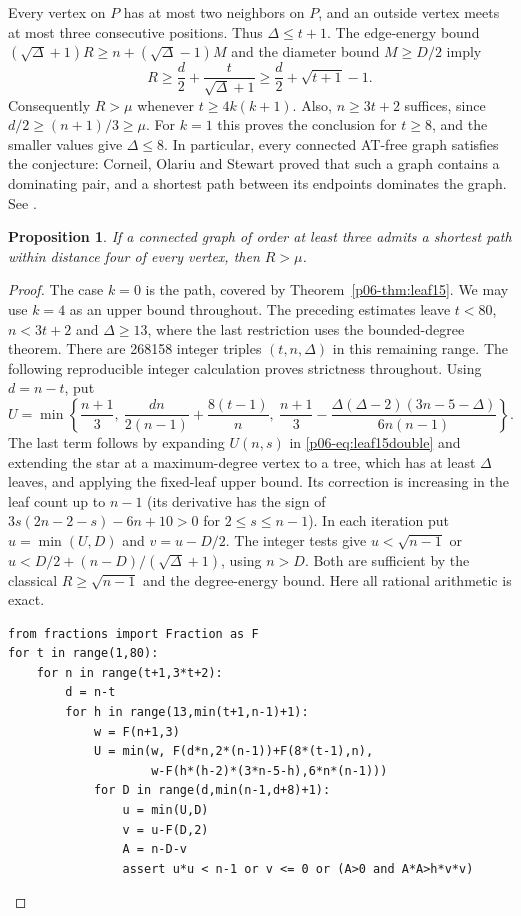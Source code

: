\documentclass[11pt,a4paper]{article}
\newtheorem{proposition}[theorem]{Proposition}
\begin{document}
Every vertex on $P$ has at most two neighbors on $P$, and an outside
vertex meets at most three consecutive positions. Thus $\Delta\le t+1$.
The edge-energy bound $(\sqrt\Delta+1)R\ge n+(\sqrt\Delta-1)M$
and the diameter bound $M\ge D/2$ imply
\[
 R\ge\frac d2+\frac{t}{\sqrt\Delta+1}
 \ge\frac d2+\sqrt{t+1}-1.
\]
Consequently $R>\mu$ whenever $t\ge4k(k+1)$. Also,
$n\ge3t+2$ suffices, since $d/2\ge(n+1)/3\ge\mu$.
For $k=1$ this proves the conclusion for $t\ge8$, and the smaller
values give $\Delta\le8$. In particular, every connected AT-free
graph satisfies the conjecture: Corneil, Olariu and Stewart proved
that such a graph contains a dominating pair, and a shortest path between
its endpoints dominates the graph. See \cite{p06-COS}.

\begin{proposition}
If a connected graph of order at least three admits a shortest path
within distance four of every vertex, then $R>\mu$.
\end{proposition}
\begin{proof}
The case $k=0$ is the path, covered by Theorem~\ref{p06-thm:leaf15}. We may use $k=4$ as an upper bound throughout.
The preceding estimates leave $t<80$, $n<3t+2$ and $\Delta\ge13$,
where the last restriction uses the bounded-degree theorem. There are
268158 integer triples $(t,n,\Delta)$ in this remaining range. The
following reproducible integer calculation proves strictness throughout.
Using $d=n-t$, put
\[
 U=\min\left\{\frac{n+1}3,\ \frac{dn}{2(n-1)}+\frac{8(t-1)}n,
 \ \frac{n+1}3-\frac{\Delta(\Delta-2)(3n-5-\Delta)}{6n(n-1)}\right\}.
\]
The last term follows by expanding $U(n,s)$ in \eqref{p06-eq:leaf15double} and extending the star at a maximum-degree vertex
to a tree, which has at least $\Delta$ leaves, and applying the fixed-leaf
upper bound. Its correction is increasing in the leaf count up to $n-1$
(its derivative has the sign of $3s(2n-2-s)-6n+10>0$ for $2\le s\le n-1$). In each iteration put
$u=\min(U,D)$ and $v=u-D/2$. The integer tests give
$u<\sqrt{n-1}$ or $u<D/2+(n-D)/(\sqrt\Delta+1)$,
using $n>D$. Both are sufficient by the classical $R\ge\sqrt{n-1}$
and the degree-energy bound. Here all rational arithmetic is exact.
{\small
\begin{verbatim}
from fractions import Fraction as F
for t in range(1,80):
    for n in range(t+1,3*t+2):
        d = n-t
        for h in range(13,min(t+1,n-1)+1):
            w = F(n+1,3)
            U = min(w, F(d*n,2*(n-1))+F(8*(t-1),n),
                    w-F(h*(h-2)*(3*n-5-h),6*n*(n-1)))
            for D in range(d,min(n-1,d+8)+1):
                u = min(U,D)
                v = u-F(D,2)
                A = n-D-v
                assert u*u < n-1 or v <= 0 or (A>0 and A*A>h*v*v)
\end{verbatim}
}
\end{proof}
\end{document}
